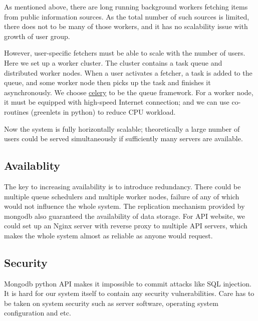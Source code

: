 As mentioned above, there are long running background workers fetching
items from public information sources. As the total number of such
sources is limited, there does not to be many of those workers, and it
has no scalability issue with growth of user group.

However, user-specific fetchers must be able to scale with the number of
users. Here we set up a worker cluster. The cluster contains a task
queue and distributed worker nodes. When a user activates a fetcher, a
task is added to the queue, and some worker node then picks up the task
and finishes it asynchronously. We choose
\href{http://www.celeryproject.org/}{celery} to be the queue framework.
For a worker node, it must be equipped with high-speed Internet
connection; and we can use co-routines (greenlets in python) to reduce
CPU workload.

Now the system is fully horizontally scalable; theoretically a large
number of users could be served simultaneously if sufficiently many
servers are available.

\subsection{Availablity}

The key to increasing availability is to introduce redundancy. There
could be multiple queue schedulers and multiple worker nodes, failure of
any of which would not influence the whole system. The replication
mechanism provided by mongodb also guaranteed the availability of data
storage. For API website, we could set up an Nginx server with reverse
proxy to multiple API servers, which makes the whole system almost as
reliable as anyone would request.

\subsection{Security}

Mongodb python API makes it impossible to commit attacks like SQL
injection. It is hard for our system itself to contain any security
vulnerabilities. Care has to be taken on system security such as server
software, operating system configuration and etc.
